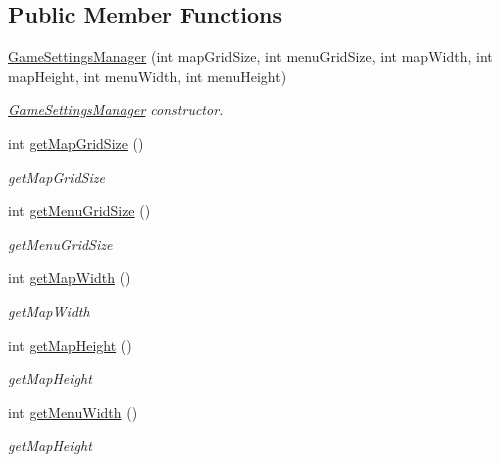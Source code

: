 \subsection*{Public Member Functions}
\begin{DoxyCompactItemize}
\item 
\hyperlink{class_student_1_1_game_settings_manager_a4555e81caf41b86ca2985e4fe95d0f5b}{Game\-Settings\-Manager} (int map\-Grid\-Size, int menu\-Grid\-Size, int map\-Width, int map\-Height, int menu\-Width, int menu\-Height)
\begin{DoxyCompactList}\small\item\em \hyperlink{class_student_1_1_game_settings_manager}{Game\-Settings\-Manager} constructor. \end{DoxyCompactList}\item 
int \hyperlink{class_student_1_1_game_settings_manager_a7bc699caf148abda328c64034add2856}{get\-Map\-Grid\-Size} ()
\begin{DoxyCompactList}\small\item\em get\-Map\-Grid\-Size \end{DoxyCompactList}\item 
int \hyperlink{class_student_1_1_game_settings_manager_a7deb3f2d9417d70434b96d5635872556}{get\-Menu\-Grid\-Size} ()
\begin{DoxyCompactList}\small\item\em get\-Menu\-Grid\-Size \end{DoxyCompactList}\item 
int \hyperlink{class_student_1_1_game_settings_manager_a8bcd7c3792379e4f2fb2963124fe9cea}{get\-Map\-Width} ()
\begin{DoxyCompactList}\small\item\em get\-Map\-Width \end{DoxyCompactList}\item 
int \hyperlink{class_student_1_1_game_settings_manager_ae81b68fc6c5ef1bb5cf1ba796b4e62de}{get\-Map\-Height} ()
\begin{DoxyCompactList}\small\item\em get\-Map\-Height \end{DoxyCompactList}\item 
int \hyperlink{class_student_1_1_game_settings_manager_a645909bd8552d5a8ab1e82db649b6920}{get\-Menu\-Width} ()
\begin{DoxyCompactList}\small\item\em get\-Map\-Height \end{DoxyCompactList}\item 

\end{DoxyCompactItemize}
